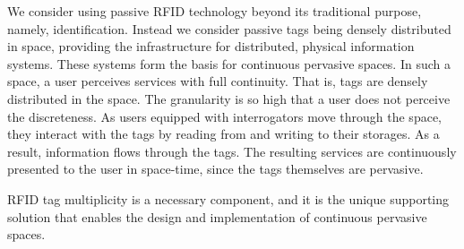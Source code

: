 We consider using passive RFID technology beyond its traditional purpose, namely, identification. Instead we consider passive tags being densely distributed in space, providing the infrastructure for distributed, physical information systems. These systems form the basis for continuous pervasive spaces. In such a space, a user perceives services with full continuity. That is, tags are densely distributed in the space. The granularity is so high that a user does not perceive the discreteness. As users equipped with interrogators move through the space, they interact with the tags by reading from and writing to their storages. As a result, information flows through the tags. The resulting services are continuously presented to the user in space-time, since the tags themselves are pervasive.

RFID tag multiplicity is a necessary component, and it is the unique supporting solution that enables the design and implementation of continuous pervasive spaces.